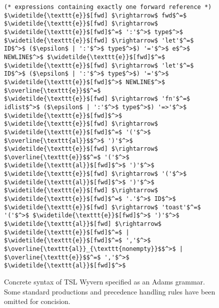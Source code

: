 \begin{figure}
\begin{lstlisting}[mathescape]
(* expressions containing exactly one forward reference *)
$\widetilde{\texttt{e}}$[fwd] $\rightarrow$ fwd$^=$
$\widetilde{\texttt{e}}$[fwd] $\rightarrow$ $\widetilde{\texttt{e}}$[fwd]$^=$ ':'$^>$ type$^>$
$\widetilde{\texttt{e}}$[fwd] $\rightarrow$ 'let'$^=$ ID$^>$ ($\epsilon$ | ':'$^>$ type$^>$) '='$^>$ e$^>$ NEWLINE$^>$ $\widetilde{\texttt{e}}$[fwd]$^=$
$\widetilde{\texttt{e}}$[fwd] $\rightarrow$ 'let'$^=$ ID$^>$ ($\epsilon$ | ':'$^>$ type$^>$) '='$^>$ $\widetilde{\texttt{e}}$[fwd]$^>$ NEWLINE$^>$ $\overline{\texttt{e}}$$^=$
$\widetilde{\texttt{e}}$[fwd] $\rightarrow$ 'fn'$^=$ idlist$^>$ ($\epsilon$ | ':'$^>$ type$^>$) '=>'$^>$ $\widetilde{\texttt{e}}$[fwd]$^>$
$\widetilde{\texttt{e}}$[fwd] $\rightarrow$ $\widetilde{\texttt{e}}$[fwd]$^=$ '('$^>$ $\overline{\texttt{al}}$$^>$ ')'$^>$
$\widetilde{\texttt{e}}$[fwd] $\rightarrow$ $\overline{\texttt{e}}$$^=$ '('$^>$ $\widetilde{\texttt{al}}$[fwd]$^>$ ')'$^>$
$\widetilde{\texttt{e}}$[fwd] $\rightarrow$ '('$^>$ $\widetilde{\texttt{al}}$[fwd]$^>$ ')'$^>$
$\widetilde{\texttt{e}}$[fwd] $\rightarrow$ $\widetilde{\texttt{e}}$[fwd]$^=$ '.'$^>$ ID$^>$
$\widetilde{\texttt{e}}$[fwd] $\rightarrow$ 'toast'$^=$ '('$^>$ $\widetilde{\texttt{e}}$[fwd]$^>$ ')'$^>$
$\widetilde{\texttt{al}}$[fwd] $\rightarrow$ $\widetilde{\texttt{e}}$[fwd]$^=$ | $\widetilde{\texttt{e}}$[fwd]$^=$ ','$^>$ $\overline{\texttt{al}}_{\texttt{nonempty}}$$^>$ | $\overline{\texttt{e}}$$^=$ ','$^>$ $\widetilde{\texttt{al}}$[fwd]$^>$
\end{lstlisting}
\caption{Concrete syntax of TSL Wyvern specified as an Adams grammar. Some standard productions and precedence handling rules have been omitted for concision.}
\label{f-grammar}
\end{figure}
